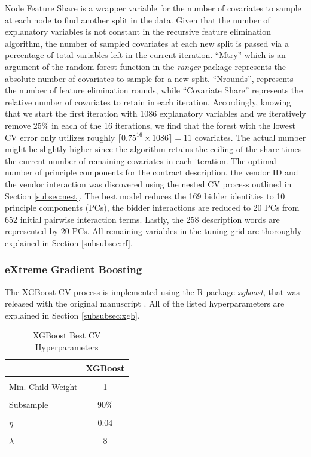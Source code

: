 \documentclass[a4paper,12pt, headsepline]{scrartcl}
\numberwithin{equation}{section}
\begin{document}
Node Feature Share is a wrapper variable for the number of covariates to sample at each node to find another split in the data. Given that the number of explanatory variables is not constant in the recursive feature elimination algorithm, the number of sampled covariates at each new split is passed via a percentage of total variables left in the current iteration. \enquote{Mtry} which is an argument of the random forest function in the \textit{ranger} package represents the absolute number of covariates to sample for a new split. \enquote{Nrounds}, represents the number of feature elimination rounds, while \enquote{Covariate Share} represents the relative number of covariates to retain in each iteration. Accordingly, knowing that we start the first iteration with 1086 explanatory variables and we iteratively remove 25\% in each of the 16 iterations, we find that the forest with the lowest CV error only utilizes roughly $\lceil 0.75^{16} \times 1086\rceil = 11$ covariates. The actual number might be slightly higher since the algorithm retains the ceiling of the share times the current number of remaining covariates in each iteration. The optimal number of principle components for the contract description, the vendor ID and the vendor interaction was discovered using the nested CV process outlined in Section \ref{subsec:nest}. The best model reduces the 169 bidder identities to 10 principle components (PCs), the bidder interactions are reduced to 20 PCs from 652 initial pairwise interaction terms. Lastly, the 258 description words are represented by 20 PCs. All remaining variables in the tuning grid are thoroughly explained in Section \ref{subsubsec:rf}.

\subsubsection{eXtreme Gradient Boosting}
The XGBoost CV process is implemented using the R package \textit{xgboost}, that was released with the original manuscript \citep{xgboost}. All of the listed hyperparameters are explained in Section \ref{subsubsec:xgb}.

\begin{table}[H]
	\centering
	\begin{tabular}[t]{lc}
		\toprule
		& XGBoost\\
		\midrule
		\cellcolor{gray!6}{$N_{iter}$} & \cellcolor{gray!6}{338}\\
		Min. Child Weight & 1\\
		\cellcolor{gray!6}{Max. Depth} & \cellcolor{gray!6}{7}\\
		Subsample & 90\%\\
		\cellcolor{gray!6}{Colsample by Tree} & \cellcolor{gray!6}{90\%}\\
		$\eta$ & 0.04\\
		\cellcolor{gray!6}{$\gamma$} & \cellcolor{gray!6}{0.01}\\
		$\lambda$ & 8\\
		\cellcolor{gray!6}{$\alpha$} & \cellcolor{gray!6}{3}\\
		\bottomrule
	\end{tabular}
	\caption{XGBoost Best CV Hyperparameters}\label{tab:xgb}
\end{table}
\end{document}

